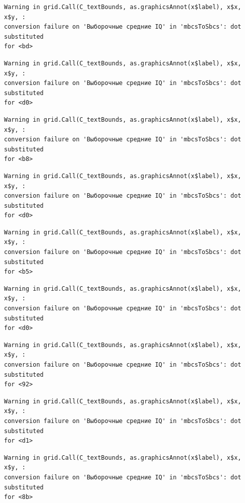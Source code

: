 \documentclass[
  letterpaper,
  DIV=11,
  numbers=noendperiod]{scrreprt}
\theoremstyle{definition}
\theoremstyle{remark}
\begin{document}
\begin{verbatim}
Warning in grid.Call(C_textBounds, as.graphicsAnnot(x$label), x$x, x$y, :
conversion failure on 'Выборочные средние IQ' in 'mbcsToSbcs': dot substituted
for <bd>
\end{verbatim}

\begin{verbatim}
Warning in grid.Call(C_textBounds, as.graphicsAnnot(x$label), x$x, x$y, :
conversion failure on 'Выборочные средние IQ' in 'mbcsToSbcs': dot substituted
for <d0>
\end{verbatim}

\begin{verbatim}
Warning in grid.Call(C_textBounds, as.graphicsAnnot(x$label), x$x, x$y, :
conversion failure on 'Выборочные средние IQ' in 'mbcsToSbcs': dot substituted
for <b8>
\end{verbatim}

\begin{verbatim}
Warning in grid.Call(C_textBounds, as.graphicsAnnot(x$label), x$x, x$y, :
conversion failure on 'Выборочные средние IQ' in 'mbcsToSbcs': dot substituted
for <d0>
\end{verbatim}

\begin{verbatim}
Warning in grid.Call(C_textBounds, as.graphicsAnnot(x$label), x$x, x$y, :
conversion failure on 'Выборочные средние IQ' in 'mbcsToSbcs': dot substituted
for <b5>
\end{verbatim}

\begin{verbatim}
Warning in grid.Call(C_textBounds, as.graphicsAnnot(x$label), x$x, x$y, :
conversion failure on 'Выборочные средние IQ' in 'mbcsToSbcs': dot substituted
for <d0>
\end{verbatim}

\begin{verbatim}
Warning in grid.Call(C_textBounds, as.graphicsAnnot(x$label), x$x, x$y, :
conversion failure on 'Выборочные средние IQ' in 'mbcsToSbcs': dot substituted
for <92>
\end{verbatim}

\begin{verbatim}
Warning in grid.Call(C_textBounds, as.graphicsAnnot(x$label), x$x, x$y, :
conversion failure on 'Выборочные средние IQ' in 'mbcsToSbcs': dot substituted
for <d1>
\end{verbatim}

\begin{verbatim}
Warning in grid.Call(C_textBounds, as.graphicsAnnot(x$label), x$x, x$y, :
conversion failure on 'Выборочные средние IQ' in 'mbcsToSbcs': dot substituted
for <8b>
\end{verbatim}
\end{document}
